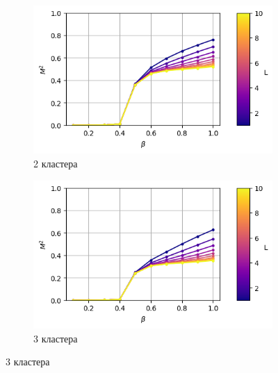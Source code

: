 \begin{figure}[ht]
	\centering
    \begin{subfigure}[t]{0.45\textwidth}
        \includegraphics*[width=\textwidth]{../images/magnetization_clusterized_W20_H50_N2.png}
        \caption*{2 кластера}
    \end{subfigure}
    \begin{subfigure}[t]{0.45\textwidth}
        \includegraphics*[width=\textwidth]{../images/magnetization_clusterized_W20_H50_N3.png}
        \caption*{3 кластера}


\end{subfigure}
\end{figure}
